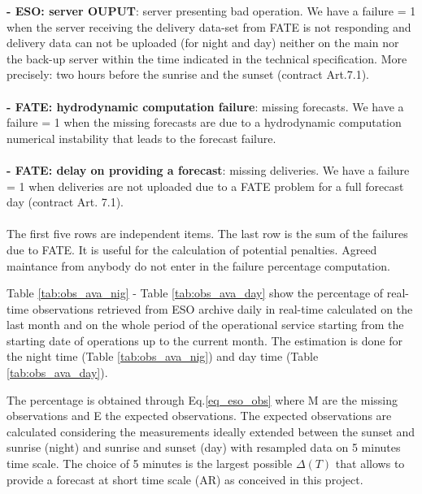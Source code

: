 \noindent
{\bf - ESO: server OUPUT}: server presenting bad operation. We have a failure = 1 when the server receiving the delivery data-set from FATE is not responding and delivery data can not be uploaded (for night and day) neither on the main nor the back-up server within the time indicated in the technical specification.  More precisely: two hours before the sunrise and the sunset (contract Art.7.1). \\ \\
\noindent
{\bf - FATE: hydrodynamic computation failure}: missing forecasts. We have a failure = 1 when the missing forecasts are due to a hydrodynamic computation numerical instability that leads to the forecast failure. \\ \\
\noindent
{\bf - FATE: delay on providing a forecast}:  missing deliveries. We have a failure = 1 when deliveries are not uploaded due to a FATE problem for a full forecast day (contract Art. 7.1). \\ \\ 

The first five rows are independent items. The last row is the sum of the failures due to FATE. It is useful for the calculation of potential penalties. Agreed maintance from anybody do not enter in the failure percentage computation.

Table \ref{tab:obs_ava_nig} - Table \ref{tab:obs_ava_day} show the percentage of real-time observations retrieved from ESO archive daily in real-time calculated on the last month and on the whole period of the operational service starting from the starting date of operations up to the current month. The estimation is done for the night time (Table \ref{tab:obs_ava_nig}) and day time (Table \ref{tab:obs_ava_day}).

The percentage is obtained through Eq.\ref{eq_eso_obs} where M are the missing observations and E the expected observations. The expected observations are calculated considering the measurements ideally extended between the sunset and sunrise (night) and sunrise and sunset (day) with resampled data on 5 minutes time scale. The choice of 5 minutes is the largest possible $\Delta(T)$ that allows to provide a forecast at short time scale (AR) as conceived in this project. 


